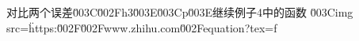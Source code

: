 对比两个误差\u003C\u002Fh3\u003E\u003Cp\u003E继续例子4中的函数 \u003Cimg src=\"https:\u002F\u002Fwww.zhihu.com\u002Fequation?tex=f%
